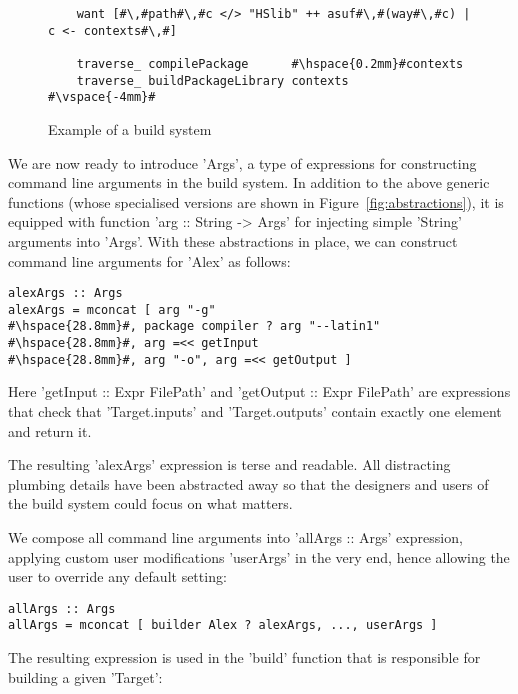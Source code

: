 \begin{figure}
\begin{lstlisting}
    want [#\,#path#\,#c </> "HSlib" ++ asuf#\,#(way#\,#c) | c <- contexts#\,#]

    traverse_ compilePackage      #\hspace{0.2mm}#contexts
    traverse_ buildPackageLibrary contexts
#\vspace{-4mm}#
\end{lstlisting}

\caption{Example of a build system\label{fig:example-abstractions}}
\end{figure}
We are now ready to introduce \lst'Args', a type of expressions for
constructing command line arguments in the build system. In addition to the
above generic functions (whose specialised versions are shown in
Figure~\ref{fig:abstractions}), it is equipped with function
\lst'arg :: String -> Args' for injecting simple \lst'String' arguments into
\lst'Args'. With these abstractions in place, we can construct command line
arguments for \lst'Alex' as follows:

\begin{lstlisting}
alexArgs :: Args
alexArgs = mconcat [ arg "-g"
#\hspace{28.8mm}#, package compiler ? arg "--latin1"
#\hspace{28.8mm}#, arg =<< getInput
#\hspace{28.8mm}#, arg "-o", arg =<< getOutput ]
\end{lstlisting}

\noindent Here \lst'getInput :: Expr FilePath' and
\lst'getOutput :: Expr FilePath' are expressions that check that
\lst'Target.inputs' and \lst'Target.outputs' contain exactly one element and
return it.

The resulting \lst'alexArgs' expression is terse and readable. All
distracting plumbing details have been abstracted away so that the designers and
users of the build system could focus on what matters. 

We compose all command line arguments into \lst'allArgs :: Args' expression,
applying custom user modifications \lst'userArgs' in the very end, hence
allowing the user to override any default setting:

\begin{lstlisting}
allArgs :: Args
allArgs = mconcat [ builder Alex ? alexArgs, ..., userArgs ]
\end{lstlisting}

The resulting expression is used in the \lst'build' function that is responsible
for building a given \lst'Target':


